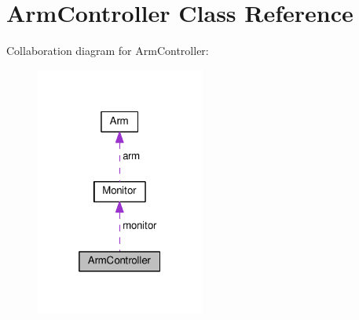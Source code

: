 \hypertarget{class_arm_controller}{}\section{Arm\+Controller Class Reference}
\label{class_arm_controller}


Collaboration diagram for Arm\+Controller\+:\nopagebreak
\begin{figure}[H]
\begin{center}
\leavevmode
\includegraphics[width=157pt]{class_arm_controller__coll__graph}
\end{center}
\end{figure}
